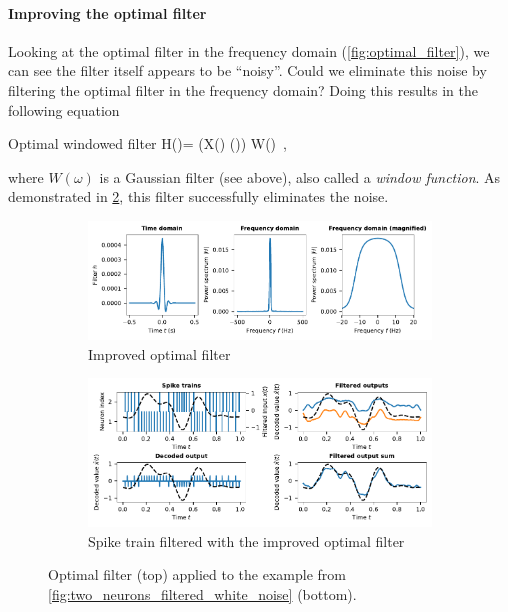 \documentclass[10pt,letterpaper,oneside]{article}
\begin{document}
\paragraph{Improving the optimal filter}
Looking at the optimal filter in the frequency domain (\cref{fig:optimal_filter}), we can see the filter itself appears to be \enquote{noisy}. Could we eliminate this noise by filtering the optimal filter in the frequency domain? Doing this results in the following equation
\begin{ImportantEqn}{Optimal windowed filter}
	H(\omega)= {{(X(\omega) (\omega)) \ast W(\omega)} } \,,
	\label{eqn:optimal_windowed_filter}
\end{ImportantEqn}
where $W(\omega)$ is a Gaussian filter (see above), also called a \emph{window function}. As demonstrated in \cref{fig:filter_improved}, this filter successfully eliminates the noise.


\begin{figure}
	\begin{subfigure}{\textwidth}
		\centering
		\includegraphics{media/optimal_filter_improved.pdf}
		\caption{Improved optimal filter}
		\label{fig:optimal_filter_improved}
	\end{subfigure}
	\begin{subfigure}{\textwidth}
		\centering
		\includegraphics{media/two_neurons_filtered_optimal_small.pdf}
		\caption{Spike train filtered with the improved optimal filter}
	\end{subfigure}
	\caption{Optimal filter (top) applied to the example from \cref{fig:two_neurons_filtered_white_noise} (bottom). }
	\label{fig:filter_improved}
\end{figure}
\end{document}
